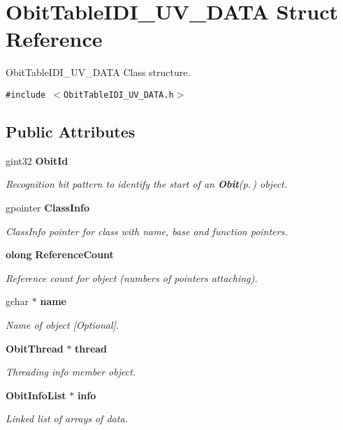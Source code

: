 \section{Obit\-Table\-IDI\_\-UV\_\-DATA Struct Reference}
\label{structObitTableIDI__UV__DATA}
Obit\-Table\-IDI\_\-UV\_\-DATA Class structure.  


{\tt \#include $<$Obit\-Table\-IDI\_\-UV\_\-DATA.h$>$}

\subsection*{Public Attributes}
\begin{CompactItemize}
\item 
gint32 {\bf Obit\-Id}
\begin{CompactList}\small\item\em Recognition bit pattern to identify the start of an {\bf Obit}{\rm (p.\,\pageref{structObit})} object. \item\end{CompactList}\item 
gpointer {\bf Class\-Info}
\begin{CompactList}\small\item\em Class\-Info pointer for class with name, base and function pointers. \item\end{CompactList}\item 
{\bf olong} {\bf Reference\-Count}
\begin{CompactList}\small\item\em Reference count for object (numbers of pointers attaching). \item\end{CompactList}\item 
gchar $\ast$ {\bf name}
\begin{CompactList}\small\item\em Name of object [Optional]. \item\end{CompactList}\item 
{\bf Obit\-Thread} $\ast$ {\bf thread}
\begin{CompactList}\small\item\em Threading info member object. \item\end{CompactList}\item 
{\bf Obit\-Info\-List} $\ast$ {\bf info}
\begin{CompactList}\small\item\em Linked list of arrays of data. \item\end{CompactList}\item 

\end{CompactItemize}
